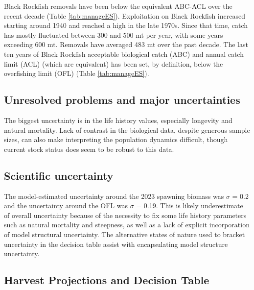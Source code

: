 \documentclass[11pt,
  english,
  letterpaper,
]{article}
\begin{document}
Black Rockfish removals have been below the equivalent ABC-ACL over the recent decade (Table \ref{tab:manageES}). Exploitation on Black Rockfish increased starting around 1940 and reached a high in the late 1970s. Since that time, catch has mostly fluctuated between 300 and 500 mt per year, with some years exceeding 600 mt. Removals have averaged 483 mt over the past decade. The last ten years of Black Rockfish acceptable biological catch (ABC) and annual catch limit (ACL) (which are equivalent) has been set, by definition, below the overfishing limit (OFL) (Table \ref{tab:manageES}).



\clearpage

\hypertarget{unresolved-problems-and-major-uncertainties}{%
\subsection*{Unresolved problems and major uncertainties}\label{unresolved-problems-and-major-uncertainties}}

The biggest uncertainty is in the life history values, especially longevity and natural mortality. Lack of contrast in the biological data, despite generous sample sizes, can also make interpreting the population dynamics difficult, though current stock status does seem to be robust to this data.

\hypertarget{scientific-uncertainty}{%
\subsection*{Scientific uncertainty}\label{scientific-uncertainty}}

The model-estimated uncertainty around the 2023 spawning biomass was \(\sigma\) = 0.2 and the uncertainty around the OFL was \(\sigma\) = 0.19. This is likely underestimate of overall uncertainty because of the necessity to fix some life history parameters such as natural mortality and steepness, as well as a lack of explicit incorporation of model structural uncertainty. The alternative states of nature used to bracket uncertainty in the decision table assist with encapsulating model structure uncertainty.

\hypertarget{harvest-projections-and-decision-table}{%
\subsection*{Harvest Projections and Decision Table}\label{harvest-projections-and-decision-table}}
\end{document}
